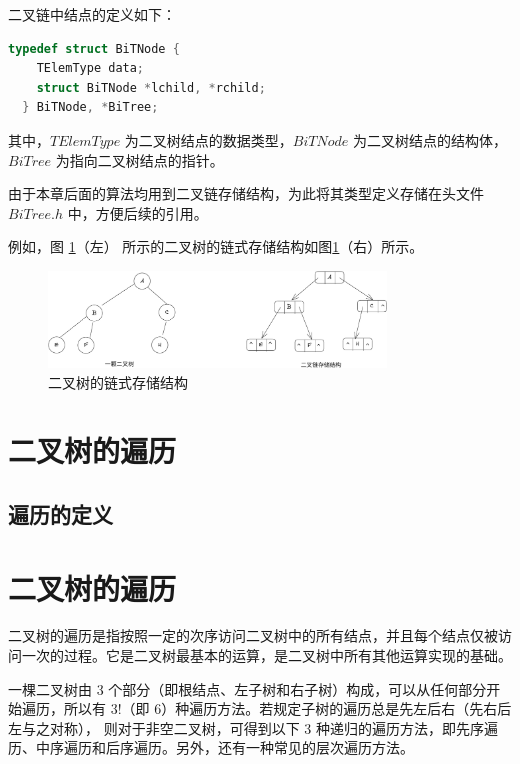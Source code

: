 \documentclass[lang=cn,newtx,10pt,scheme=chinese]{elegantbook}
\begin{document}
二叉链中结点的定义如下：

\begin{lstlisting}[language=C++, caption={二叉树链式存储结构}]
  typedef struct BiTNode {
    TElemType data;
    struct BiTNode *lchild, *rchild;
  } BiTNode, *BiTree;
\end{lstlisting}

其中，$TElemType$ 为二叉树结点的数据类型，$BiTNode$ 为二叉树结点的结构体，$BiTree$ 为指向二叉树结点的指针。

由于本章后面的算法均用到二叉链存储结构，为此将其类型定义存储在头文件 $BiTree.h$ 中，方便后续的引用。

例如，图 \ref{fig:binary_tree_link}（左） 所示的二叉树的链式存储结构如图\ref{fig:binary_tree_link}（右）所示。

\begin{figure}[h]
  \centering
  \includegraphics[width=0.8\textwidth]{./figure/pdf/cropped/BTreeGraph.pdf}
  \caption{二叉树的链式存储结构}
  \label{fig:binary_tree_link}
\end{figure}

\section{二叉树的遍历}


\subsection{遍历的定义}
\section{二叉树的遍历}

二叉树的遍历是指按照一定的次序访问二叉树中的所有结点，并且每个结点仅被访问一次的过程。它是二叉树最基本的运算，是二叉树中所有其他运算实现的基础。

一棵二叉树由 3 个部分（即根结点、左子树和右子树）构成，可以从任何部分开始遍历，所以有 $3!$（即 6）种遍历方法。若规定子树的遍历总是先左后右（先右后左与之对称），
则对于非空二叉树，可得到以下 3 种递归的遍历方法，即先序遍历、中序遍历和后序遍历。另外，还有一种常见的层次遍历方法。
\end{document}
